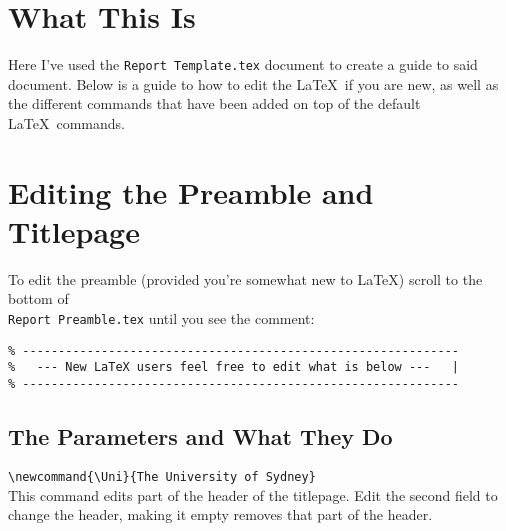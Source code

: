 \documentclass[a4paper, 12pt, english]{article}
\begin{document}

    \fullPageTitle

    \thispagestyle{noheader}
    \tableofcontents



    \newpage

    \section{What This Is}
        \label{sec: what this is}
        
        Here I've used the \verb+Report Template.tex+ document to create a guide to said document. Below is a guide to how to edit the \LaTeX~if you are new, as well as the different commands that have been added on top of the default \LaTeX~commands.
    

    \section{Editing the Preamble and Titlepage}
        \label{sec: editing the preamble}

        To edit the preamble (provided you're somewhat new to \LaTeX) scroll to the bottom of \\\verb+Report Preamble.tex+ until you see the comment:

        \begin{lstlisting}
% -------------------------------------------------------------
%   --- New LaTeX users feel free to edit what is below ---   |
% -------------------------------------------------------------
        \end{lstlisting}



        \subsection{The Parameters and What They Do}
            \label{subsec: the parameters and what they do}

            \verb+\newcommand{\Uni}{The University of Sydney}+\\
            This command edits part of the header of the titlepage. Edit the second field to change the header, making it empty removes that part of the header.
\end{document}
